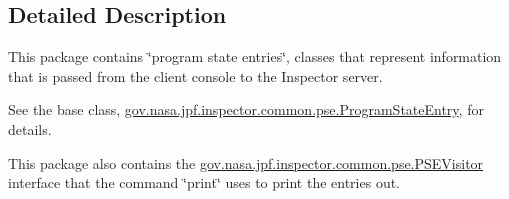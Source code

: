 \subsection{Detailed Description}
This package contains \char`\"{}program state entries\char`\"{}, classes that represent information that is passed from the client console to the Inspector server. 

See the base class, \hyperlink{classgov_1_1nasa_1_1jpf_1_1inspector_1_1common_1_1pse_1_1_program_state_entry}{gov.\+nasa.\+jpf.\+inspector.\+common.\+pse.\+Program\+State\+Entry}, for details.

This package also contains the \hyperlink{interfacegov_1_1nasa_1_1jpf_1_1inspector_1_1common_1_1pse_1_1_p_s_e_visitor}{gov.\+nasa.\+jpf.\+inspector.\+common.\+pse.\+P\+S\+E\+Visitor} interface that the command \char`\"{}print\char`\"{} uses to print the entries out. 
